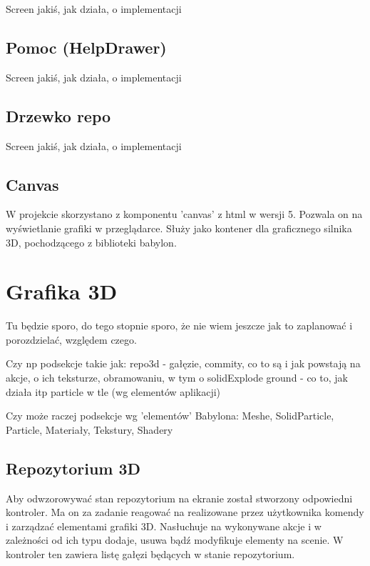 \documentclass[11pt,a4paper,polish,thesis]{dcsbook}
\begin{document}
	Screen jakiś, jak działa, o implementacji
	
	\subsection{Pomoc (HelpDrawer)}
	
	Screen jakiś, jak działa, o implementacji
	
	\subsection{Drzewko repo}
	
	Screen jakiś, jak działa, o implementacji
	
	\subsection{Canvas}
	
	W projekcie skorzystano z komponentu 'canvas' z html w wersji 5. Pozwala on na wyświetlanie grafiki w przeglądarce. Służy jako kontener dla graficznego silnika 3D, pochodzącego z biblioteki babylon. 
	
	\section{Grafika 3D}
	Tu będzie sporo, do tego stopnie sporo, że nie wiem jeszcze jak to zaplanować i porozdzielać, względem czego.
	
	Czy np podsekcje takie jak:
	repo3d - gałęzie, commity, co to są i jak powstają na akcje, o ich teksturze, obramowaniu, w tym o solidExplode
	ground - co to, jak działa itp
	particle w tle
	(wg elementów aplikacji)
	
	Czy może raczej podsekcje wg 'elementów' Babylona:
	Meshe, SolidParticle, Particle, Materiały, Tekstury, Shadery
	
	

	\subsection{Repozytorium 3D}
		Aby odwzorowywać stan repozytorium na ekranie został stworzony odpowiedni kontroler. Ma on za zadanie reagować na realizowane przez użytkownika komendy i zarządzać elementami grafiki 3D. Nasłuchuje na wykonywane akcje i w zależności od ich typu dodaje, usuwa bądź modyfikuje elementy na scenie. W kontroler ten zawiera listę gałęzi będących w stanie repozytorium. %
\end{document}
